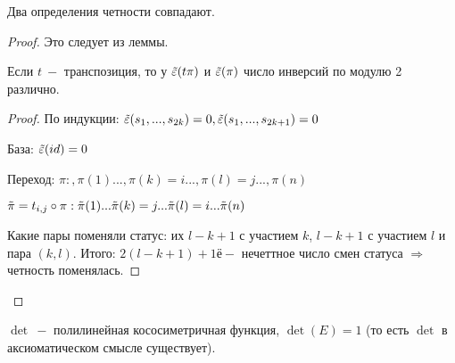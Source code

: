 \begin{theorem}
    Два определения четности совпадают.
\end{theorem}

\begin{proof}
    Это следует из леммы.

    \begin{lemma}
        Если $t\ -$ транспозиция, то  у $\Tilde{\varepsilon}(t\pi)$ и $\Tilde{\varepsilon}(\pi)$ число инверсий по модулю 2 различно.
    \end{lemma}

    \begin{proof}
        По индукции: $\Tilde{\varepsilon}(s_1,...,s_{2k})= 0, \Tilde{\varepsilon}(s_1,...,s_{2k+1})= 0$

        База: $\Tilde{\varepsilon}(id)=0$

        Переход:
        $\pi:,\pi(1)...,\pi(k)=i...,\pi(l)=j...,\pi(n)$

        $\Tilde{\pi}=t_{i,j}\circ\pi:\Tilde{\pi}(1)...\Tilde{\pi}(k)=j...\Tilde{\pi}(l)=i...\Tilde{\pi}(n)$

        Какие пары поменяли статус: их $l-k+1$ с участием $k$, $l-k+1$ с участием $l$ и пара $(k,l)$. Итого: $2(l-k+1)+1ё -$ нечеттное число смен статуса $\Rightarrow$ четность поменялась.
    \end{proof}
\end{proof}

\begin{theorem}
    $\det\ -$ полилинейная кососиметричная функция, $\det(E)=1$ (то есть $\det$ в аксиоматическом смысле существует).
\end{theorem}

